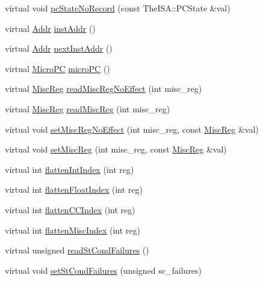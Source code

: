 \begin{DoxyCompactItemize}
\item 
virtual void \hyperlink{classO3ThreadContext_a6005386aeeaecb35499c3199fb47ba2f}{pcStateNoRecord} (const TheISA::PCState \&val)
\item 
virtual \hyperlink{base_2types_8hh_af1bb03d6a4ee096394a6749f0a169232}{Addr} \hyperlink{classO3ThreadContext_a6b3010be20c1be74148cde2913b3f7c3}{instAddr} ()
\item 
virtual \hyperlink{base_2types_8hh_af1bb03d6a4ee096394a6749f0a169232}{Addr} \hyperlink{classO3ThreadContext_a4eb5bb6ecd5d32c0920ed2dce19036a0}{nextInstAddr} ()
\item 
virtual \hyperlink{base_2types_8hh_adfb4d8b20c5abc8be73dd367b16f2d57}{MicroPC} \hyperlink{classO3ThreadContext_ae2a795211f2911e8b1f66bab373b6ac2}{microPC} ()
\item 
virtual \hyperlink{classThreadContext_aaf5f073a387db0556d1db4bcc45428bc}{MiscReg} \hyperlink{classO3ThreadContext_af74f978ea46123cf036c750e52d98438}{readMiscRegNoEffect} (int misc\_\-reg)
\item 
virtual \hyperlink{classThreadContext_aaf5f073a387db0556d1db4bcc45428bc}{MiscReg} \hyperlink{classO3ThreadContext_a37c9d5a045a0d8da5db34db2dd663d40}{readMiscReg} (int misc\_\-reg)
\item 
virtual void \hyperlink{classO3ThreadContext_a763517aaea2f3decbc1ef9d064216b6f}{setMiscRegNoEffect} (int misc\_\-reg, const \hyperlink{classThreadContext_aaf5f073a387db0556d1db4bcc45428bc}{MiscReg} \&val)
\item 
virtual void \hyperlink{classO3ThreadContext_a1877dde4f3eb17a8b7d33ea40176c148}{setMiscReg} (int misc\_\-reg, const \hyperlink{classThreadContext_aaf5f073a387db0556d1db4bcc45428bc}{MiscReg} \&val)
\item 
virtual int \hyperlink{classO3ThreadContext_aa529f2d70520c578e3e29b3bf1a66312}{flattenIntIndex} (int reg)
\item 
virtual int \hyperlink{classO3ThreadContext_ab9ea3f8f1a21df875c7273c7377dfac1}{flattenFloatIndex} (int reg)
\item 
virtual int \hyperlink{classO3ThreadContext_ac33d74353e36a595ec48962cd0446320}{flattenCCIndex} (int reg)
\item 
virtual int \hyperlink{classO3ThreadContext_a5adc7d32f3a8bd75c5dc0a62d95564fd}{flattenMiscIndex} (int reg)
\item 
virtual unsigned \hyperlink{classO3ThreadContext_a8cbbb8eea07477baa78336be358c632b}{readStCondFailures} ()
\item 
virtual void \hyperlink{classO3ThreadContext_af236f8e23dce0c08a46c19ebfdb1aaaf}{setStCondFailures} (unsigned sc\_\-failures)

\end{DoxyCompactItemize}
